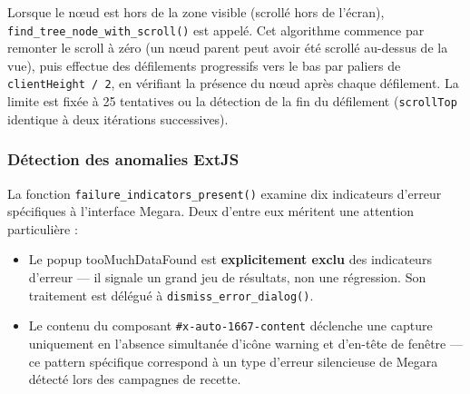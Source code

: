 \documentclass[12pt, a4paper]{report}
\begin{document}
Lorsque le nœud est hors de la zone visible (scrollé hors de l'écran), \texttt{find\_tree\_node\_with\_scroll()} est appelé. Cet algorithme commence par remonter le scroll à zéro (un nœud parent peut avoir été scrollé au-dessus de la vue), puis effectue des défilements progressifs vers le bas par paliers de \texttt{clientHeight / 2}, en vérifiant la présence du nœud après chaque défilement. La limite est fixée à 25 tentatives ou la détection de la fin du défilement (\texttt{scrollTop} identique à deux itérations successives).

\subsubsection{Détection des anomalies ExtJS}

La fonction \texttt{failure\_indicators\_present()} examine dix indicateurs d'erreur spécifiques à l'interface Megara. Deux d'entre eux méritent une attention particulière :

\begin{itemize}
  \item Le popup \og{}tooMuchDataFound\fg{} est \textbf{explicitement exclu} des indicateurs d'erreur — il signale un grand jeu de résultats, non une régression. Son traitement est délégué à \texttt{dismiss\_error\_dialog()}.
  \item Le contenu du composant \texttt{\#x-auto-1667-content} déclenche une capture uniquement en l'absence simultanée d'icône warning et d'en-tête de fenêtre — ce pattern spécifique correspond à un type d'erreur silencieuse de Megara détecté lors des campagnes de recette.
\end{itemize}
\end{document}
